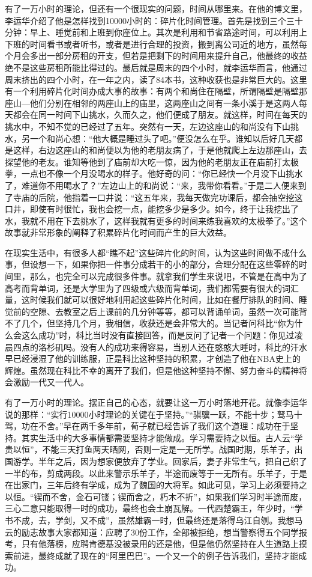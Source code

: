 \documentclass{article}
\begin{document}
有了一万小时的理论，但还有一个很现实的问题，时间从哪里来。在他的博文里，李运华介绍了他是怎样找到10000小时的：碎片化时间管理。首先是找到三个三十分钟：早上、睡觉前和上班到你座位上。其次是利用和节省路途时间，可以利用上下班的时间看书或者听书，或者是进行合理的投资，搬到离公司近的地方，虽然每个月会多出一部分房租的开支，但若是把剩下的时间用来提升自己，他最终的收益绝不是这些房租所能比得过的。最后就是周末的四个小时，就李运华而言，他通过周末挤出的四个小时，在一年之内，读了84本书，这种收获也是非常巨大的。这里有一个利用碎片化时间办成大事的故事：有两个和尚住在隔壁，所谓隔壁是隔壁那座山—他们分别在相邻的两座山上的庙里，这两座山之间有一条小溪于是这两人每天都会在同一时间下山挑水，久而久之，他们便成了朋友。就这样，时间在每天的挑水中，不知不觉的已经过了五年。突然有一天，左边这座山的和尚没有下山挑水，另一个和尚心想：“他大概是睡过头了吧。”便没怎么在乎。谁知以后好几天都是这样，右边这座山的和尚便以为他的老朋友病了，于是他就爬上左边那座山，去探望他的老友。谁知等他到了庙前却大吃一惊，因为他的老朋友正在庙前打太极拳，一点也不像一个月没喝水的样子。他好奇的问：“你已经快一个月没下山挑水了，难道你不用喝水了？”左边山上的和尚说：“来，我带你看看。”于是二人便来到了寺庙的后院，他指着一口井说：“这五年来，我每天做完功课后，都会抽空挖这口井，即使有时很忙，我也会挖一点，能挖多少是多少。如今，终于让我挖出了水，我就不用在下去挑水了，这样我就有更多的时间来练我喜欢的太极拳了。”这个故事就非常形象的阐释了积累碎片化时间而产生的巨大效益。


在现实生活中，有很多人都“瞧不起”这些碎片化的时间，认为这些时间做不成什么事，但设想一下，如果你把一件事分成若干的小的部分，合理分配在这些零碎的时间里，那么，也完全可以完成很多件事。就拿我们学生来说吧，不管是在高中为了高考而背单词，还是大学里为了四级或六级而背单词，我们都需要有很大的词汇量，这时候我们就可以很好地利用起这些碎片化时间，比如在餐厅排队的时间、睡觉前的空隙、去教室之后上课前的几分钟等等，都可以背诵单词，虽然一次可能背不了几个，但坚持几个月，我相信，收获还是会非常大的。当记者问科比“你为什么会这么成功”时，科比当时没有直接回答，而是反问了记者一个问题：你见过凌晨四点的洛杉矶吗。没有人的成功来得容易，当别人还在憨憨大睡时，科比的汗水早已经浸湿了他的训练服，正是科比这种坚持的积累，才创造了他在NBA史上的辉煌。虽然现在科比不幸的离开了我们，但是他这种坚持不懈、努力奋斗的精神将会激励一代又一代人。


有了一万小时的理论。摆正自己的心态，就要让这一万小时落地开花。就像李运华说的那样：“实行10000小时理论的关键在于坚持。”“骐骥一跃，不能十步；驽马十驾，功在不舍。”早在两千多年前，荀子就已经告诉了我们这个道理：成功在于坚持。其实生活中的大多事情都需要坚持才能做成。学习需要持之以恒。古人云“学贵以恒”，不能三天打鱼两天晒网，否则一定是一无所学。战国时期，乐羊子，出国游学。半年之后，因为想家便放弃了学业。回家后，妻子非常生气，把自己织了一半的布，剪成两段。以此来警示乐羊子，半途而废等于一无所有。乐羊子，于是在出家门，三年后终有学成，成为了魏国的大将军。如此可见，学习上必须要持之以恒。“锲而不舍，金石可镂；锲而舍之，朽木不折”，如果我们学习时半途而废，三心二意只能取得一时的成功，最终也会土崩瓦解。一代西楚霸王，年少时，“学书不成，去，学剑，又不成”，虽然雄霸一时，但最终还是落得乌江自刎。我想马云的励志故事大家都知道：应聘了30份工作，全部被拒绝，想当警察得五个同学报考，只有他落榜，应聘肯德基没被录用的还是他，但是他仍然坚持在人生道路上摸索前进，最终成就了现在的“阿里巴巴”。一个又一个的例子告诉我们，坚持才能成功。
\end{document}
